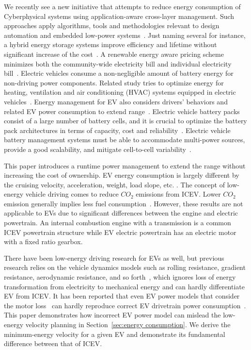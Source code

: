 \documentclass{IEEEtran}
\begin{document}
We recently see a new initiative that attempts to reduce energy consumption of Cyberphysical systems using application-aware cross-layer management. Such approaches apply algorithms, tools and methodologies relevant to design automation and embedded low-power systems~\cite{Seshia:TCAD17}. 
Just naming several for instance, a hybrid energy storage systems improve efficiency and lifetime without significant increase of the cost~\cite{Xie:TCAD13, Kim:JPS14}. 
A renewable energy aware pricing scheme minimizes both the community-wide electricity bill and individual electricity bill~\cite{Liu:TPDS17}.
Electric vehicles consume a non-negligible amount of battery energy for non-driving power components. Related study tries to optimize energy for heating, ventilation and air conditioning (HVAC) systems equipped in electric vehicles~\cite{Zhao:ICCAD15,Vatanparvar:TECS18}. 
Energy management for EV also considers drivers' behaviors and related EV power consumption to extend range~\cite{Vatanparvar:TSG18,Vatanparvar:TODAES17}.
Electric vehicle battery packs consist of a large number of battery cells, and it is crucial to optimize the battery pack architectures in terms of capacity, cost and reliability~\cite{Wu:TCAD13,Shaheer:RTCSA17}. 
Electric vehicle battery management systems must be able to accommodate multi-power sources, provide a good scalability, and mitigate cell-to-cell variability~\cite{Shin:TCAD15}.

This paper introduces a runtime power management to extend the range without increasing the cost of ownership. EV energy consumption is largely different by the cruising velocity, acceleration, weight, load slope, etc. \cite{Chang:ICCAD14}. The concept of low-energy vehicle driving comes to reduce $CO_2$ emissions from ICEV. Lower  $CO_2$ emission generally implies less fuel consumption~\cite{Seraens:thesis12}. However, these results are not applicable to EVs due to significant differences between the engine  and electric  powertrain. An internal combustion engine with a transmission is a common ICEV powertrain structure while EV electric powertrain has an electric motor with a fixed ratio gearbox.

There have been low-energy driving research for EVs as well, but previous research relies on the  vehicle dynamics models such as rolling resistance, gradient resistance, aerodynamic resistance, and so forth~\cite{Yan:NAPS14}, which ignores loss of energy transformation from electricity to mechanical energy and can hardly differentiate EV from ICEV. It has been reported that even EV power models that consider the motor loss~\cite{Lin:ICCA14, Wu:ITS15, Dib:IVPPC11} can hardly reproduce correct EV drivetrain power consumption~\cite{Hong:ASPDAC16}. This paper  demonstrates how incorrect EV power model can mislead the low-energy velocity planning in Section~\ref{sec:energy consumption}. We derive the minimum-energy velocity for a given EV and demonstrate its fundamental difference between that of ICEV. 
\end{document}
